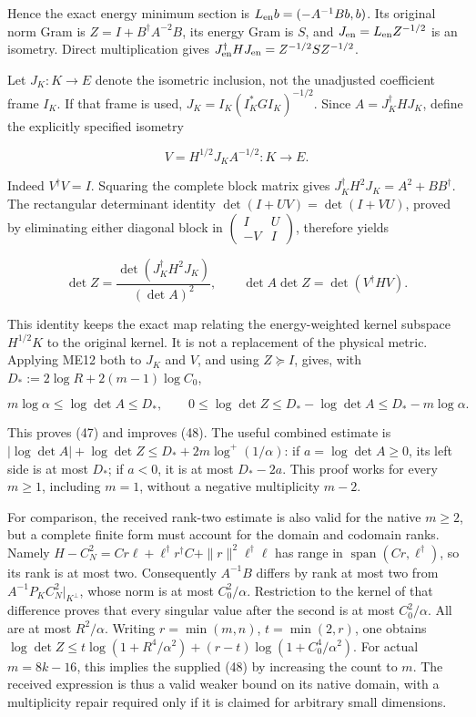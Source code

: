 \documentclass[11pt]{article}
\begin{document}
Hence the exact energy minimum section is \(L_{\rm en}b=(-A^{-1}Bb,b)\). Its original norm Gram is \(Z=I+B^\dagger A^{-2}B\), its energy Gram is \(S\), and \(J_{\rm en}=L_{\rm en}Z^{-1/2}\) is an isometry. Direct multiplication gives \(J_{\rm en}^\dagger HJ_{\rm en}=Z^{-1/2}SZ^{-1/2}\).

Let \(J_K:K\to E\) denote the isometric inclusion, not the unadjusted coefficient frame \(I_K\). If that frame is used, \(J_K=I_K(I_K^*GI_K)^{-1/2}\). Since \(A=J_K^\dagger HJ_K\), define the explicitly specified isometry

\[
V=H^{1/2}J_KA^{-1/2}:K\longrightarrow E.
\]

Indeed \(V^\dagger V=I\). Squaring the complete block matrix gives \(J_K^\dagger H^2J_K=A^2+BB^\dagger\). The rectangular determinant identity \(\det(I+UV)=\det(I+VU)\), proved by eliminating either diagonal block in \(\left(\begin{smallmatrix}I&U\\-V&I\end{smallmatrix}\right)\), therefore yields

\[
\boxed{\det Z=\frac{\det(J_K^\dagger H^2J_K)}{(\det A)^2},\qquad
\det A\det Z=\det(V^\dagger HV).}
\tag{ME31}
\]

This identity keeps the exact map relating the energy-weighted kernel subspace \(H^{1/2}K\) to the original kernel. It is not a replacement of the physical metric. Applying ME12 both to \(J_K\) and \(V\), and using \(Z\succeq I\), gives, with \(D_*:=2\log R+2(m-1)\log C_0\),

\[
\boxed{m\log\alpha\le\log\det A\le D_*,\qquad
0\le\log\det Z\le D_* -\log\det A\le D_*-m\log\alpha.}
\tag{ME32}
\]

This proves (47) and improves (48). The useful combined estimate is \(|\log\det A|+\log\det Z\le D_*+2m\log^+(1/\alpha)\): if \(a=\log\det A\ge0\), its left side is at most \(D_*\); if \(a<0\), it is at most \(D_*-2a\). This proof works for every \(m\ge1\), including \(m=1\), without a negative multiplicity \(m-2\).

For comparison, the received rank-two estimate is also valid for the native \(m\ge2\), but a complete finite form must account for the domain and codomain ranks. Namely \(H-C_N^2=Cr\ell+\ell^\dagger r^\dagger C+\|r\|^2\ell^\dagger\ell\) has range in \(\operatorname{span}(Cr,\ell^\dagger)\), so its rank is at most two. Consequently \(A^{-1}B\) differs by rank at most two from \(A^{-1}P_KC_N^2|_{K^\perp}\), whose norm is at most \(C_0^2/\alpha\). Restriction to the kernel of that difference proves that every singular value after the second is at most \(C_0^2/\alpha\). All are at most \(R^2/\alpha\). Writing \(r=\min(m,n)\), \(t=\min(2,r)\), one obtains \(\log\det Z\le t\log(1+R^4/\alpha^2)+(r-t)\log(1+C_0^4/\alpha^2)\). For actual \(m=8k-16\), this implies the supplied (48) by increasing the count to \(m\). The received expression is thus a valid weaker bound on its native domain, with a multiplicity repair required only if it is claimed for arbitrary small dimensions.
\end{document}
